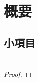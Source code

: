 \documentclass[10.5pt,a4paper,dvipdfmx]{jarticle}
\author{hogehoge}                      %
\affiliation{hoge学部huga学科}          %
\date{\today}                         %
\begin{document}
\section{概要}
\subsection{小項目}
\lipsum[30]

\newpage

\section{}
\begin{dfn}[abc]
    \lipsum[10]
\end{dfn}

\begin{prop}
    \lipsum[25]
\end{prop}
\begin{proof}
    \lipsum[15]
\end{proof}
\end{document}
